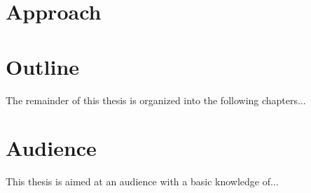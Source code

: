 %
%
%

\section{Approach}

\section{Outline}
The remainder of this thesis is organized into the following chapters...

\section{Audience}
This thesis is aimed at an audience with a basic knowledge of...
